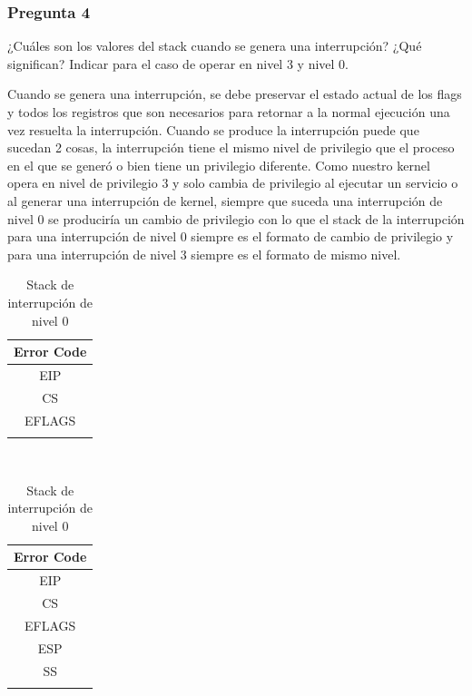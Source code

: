 \documentclass[10pt, a4paper]{article}
\begin{document}
\subsubsection*{Pregunta 4}
 \begin{framed}
¿Cuáles son los valores del stack cuando se genera una interrupción? ¿Qué significan? Indicar para el caso de operar en nivel 3 y nivel 0.
\end{framed}
Cuando se genera una interrupción, se debe preservar el estado actual de los flags y todos los registros que son necesarios para retornar a la normal ejecución una vez resuelta la interrupción.
Cuando se produce la interrupción puede que sucedan 2 cosas, la interrupción tiene el mismo nivel de privilegio que el proceso en el que se generó o bien tiene un privilegio diferente. Como nuestro kernel opera en nivel de privilegio 3 y solo cambia de privilegio al ejecutar un servicio o al generar una interrupción de kernel, siempre que suceda una interrupción de nivel 0 se produciría un cambio de privilegio con lo que el stack de la interrupción para una interrupción de nivel 0 siempre es el formato de cambio de privilegio y para una interrupción de nivel 3 siempre es el formato de mismo nivel.

\begin{table}[h]
	\begin{subtable}[h]{0.5\textwidth}
		\begin{minipage}{0.7\textwidth}
			\hspace*{0.3\textwidth}
			\begin{tabular}{|c|}
				\\ \hline
				Error Code \\ \hline
				EIP \\ \hline
				CS \\ \hline
				EFLAGS \\ \hline
				\\
			\end{tabular}
			\caption{Stack de interrupción de nivel 3}
		\end{minipage}
	\end{subtable}
~
	\begin{subtable}[h]{0.5\textwidth}
		\begin{minipage}{0.7\textwidth}
			\hspace*{0.3\textwidth}
			\begin{tabular}{|c|}
				\\ \hline
				Error Code \\ \hline
				EIP \\ \hline
				CS \\ \hline
				EFLAGS \\ \hline
				ESP \\ \hline
				SS \\ \hline
				\\
			\end{tabular}
			\caption{Stack de interrupción de nivel 0}
		\end{minipage}
	\end{subtable}
\end{table}
\end{document}
